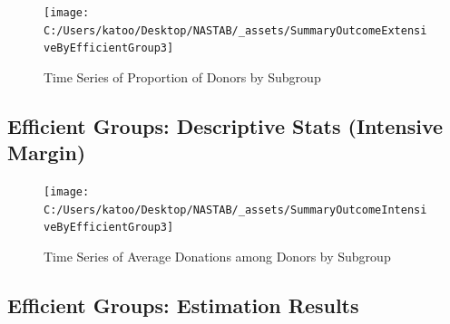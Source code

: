 \documentclass[ review  , 3p ]{elsarticle}
\begin{document}
  \begin{figure}

  {\centering \texttt{[image: C:/Users/katoo/Desktop/NASTAB/\_assets/SummaryOutcomeExtensiveByEfficientGroup3]} 

  }

  \caption{Time Series of Proportion of Donors by Subgroup}\label{fig:unnamed-chunk-12}
  \end{figure}

  \hypertarget{efficient-groups-descriptive-stats-intensive-margin}{%
  \subsection{Efficient Groups: Descriptive Stats (Intensive Margin)}\label{efficient-groups-descriptive-stats-intensive-margin}}

  \begin{figure}

  {\centering \texttt{[image: C:/Users/katoo/Desktop/NASTAB/\_assets/SummaryOutcomeIntensiveByEfficientGroup3]} 

  }

  \caption{Time Series of Average Donations among Donors by Subgroup}\label{fig:unnamed-chunk-13}
  \end{figure}

  \hypertarget{efficient-groups-estimation-results}{%
  \subsection{Efficient Groups: Estimation Results}\label{efficient-groups-estimation-results}}
\end{document}
